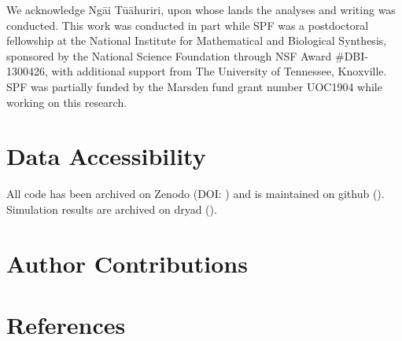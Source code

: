 \documentclass[
  11pt,
]{article}
\begin{document}
We acknowledge Ngāi Tūāhuriri, upon whose lands the analyses and writing
was conducted. This work was conducted in part while SPF was a
postdoctoral fellowship at the National Institute for Mathematical and
Biological Synthesis, sponsored by the National Science Foundation
through NSF Award \#DBI-1300426, with additional support from The
University of Tennessee, Knoxville. SPF was partially funded by the
Marsden fund grant number UOC1904 while working on this research.

\hypertarget{data-accessibility}{%
\section{Data Accessibility}\label{data-accessibility}}

All code has been archived on Zenodo (DOI: ) and is maintained on github
(). Simulation results are archived on dryad ().

\hypertarget{author-contributions}{%
\section{Author Contributions}\label{author-contributions}}

\hypertarget{references}{%
\section*{References}\label{references}}
\end{document}
